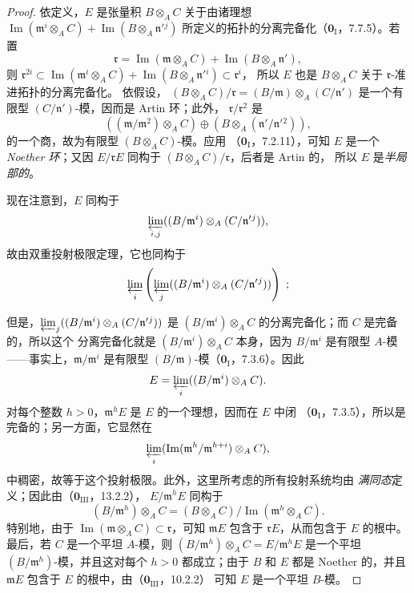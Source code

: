 \begin{proof}
依定义，$E$ 是张量积 $B\otimes_A C$ 关于由诸理想
$\operatorname{Im}(\mathfrak m^i\otimes_A C)+
\operatorname{Im}(B\otimes_A\mathfrak n'{}^j)$
所定义的拓扑的分离完备化（$\mathbf 0_{\mathrm I}$，7.7.5）。若置
\[
  \mathfrak r=\operatorname{Im}(\mathfrak m\otimes_A C)+
  \operatorname{Im}(B\otimes_A\mathfrak n'),
\]
则
$\mathfrak r^{2i}\subset
\operatorname{Im}(\mathfrak m^i\otimes_A C)+
\operatorname{Im}(B\otimes_A\mathfrak n'{}^i)\subset\mathfrak r^i$，
所以 $E$ 也是 $B\otimes_A C$ 关于 $\mathfrak r$-准进拓扑的分离完备化。
依假设，
$(B\otimes_A C)/\mathfrak r=(B/\mathfrak m)\otimes_A(C/\mathfrak n')$
是一个有限型 $(C/\mathfrak n')$-模，因而是 Artin 环；此外，
$\mathfrak r/\mathfrak r^2$ 是
\[
  ((\mathfrak m/\mathfrak m^2)\otimes_A C)
  \oplus(B\otimes_A(\mathfrak n'/\mathfrak n'{}^2)),
\]
的一个商，故为有限型 $(B\otimes_A C)$-模。应用
（$\mathbf 0_{\mathrm I}$，7.2.11），可知 $E$ 是一个\emph{Noether 环}；又因
$E/\mathfrak rE$ 同构于 $(B\otimes_A C)/\mathfrak r$，后者是 Artin 的，
所以 $E$ 是\emph{半局部的}。

现在注意到，$E$ 同构于
\[
  \varprojlim_{i,j}((B/\mathfrak m^i)\otimes_A(C/\mathfrak n'{}^j)),
\]
故由双重投射极限定理，它也同构于
\[
  \varprojlim_i\left(\varprojlim_j
  ((B/\mathfrak m^i)\otimes_A(C/\mathfrak n'{}^j))\right)~;
\]


但是，$\varprojlim_j((B/\mathfrak m^i)\otimes_A(C/\mathfrak n'{}^j))$
是 $(B/\mathfrak m^i)\otimes_A C$ 的分离完备化；而 $C$ 是完备的，所以这个
分离完备化就是 $(B/\mathfrak m^i)\otimes_A C$ 本身，因为
$B/\mathfrak m^i$ 是有限型 $A$-模——事实上，$\mathfrak m/\mathfrak m^i$
是有限型 $(B/\mathfrak m)$-模（$\mathbf 0_{\mathrm I}$，7.3.6）。因此
\[
  E=\varprojlim_i((B/\mathfrak m^i)\otimes_A C).
\]
对每个整数 $h>0$，$\mathfrak m^hE$ 是 $E$ 的一个理想，因而在 $E$ 中闭
（$\mathbf 0_{\mathrm I}$，7.3.5），所以是完备的；另一方面，它显然在
\[
  \varprojlim_i
  (\operatorname{Im}(\mathfrak m^h/\mathfrak m^{h+i})\otimes_A C),
\]
中稠密，故等于这个投射极限。此外，这里所考虑的所有投射系统均由
\emph{满同态}定义；因此由（$\mathbf 0_{\mathrm{III}}$，13.2.2），
$E/\mathfrak m^hE$ 同构于
\[
  (B/\mathfrak m^h)\otimes_A C
  =(B\otimes_A C)/\operatorname{Im}(\mathfrak m^h\otimes_A C).
\]
特别地，由于
$\operatorname{Im}(\mathfrak m\otimes_A C)\subset\mathfrak r$，可知
$\mathfrak mE$ 包含于 $\mathfrak rE$，从而包含于 $E$ 的根中。最后，若 $C$
是一个平坦 $A$-模，则
$(B/\mathfrak m^h)\otimes_A C=E/\mathfrak m^hE$
是一个平坦 $(B/\mathfrak m^h)$-模，并且这对每个 $h>0$ 都成立；由于 $B$ 和
$E$ 都是 Noether 的，并且
$\mathfrak mE$ 包含于 $E$ 的根中，由（$\mathbf 0_{\mathrm{III}}$，10.2.2）
可知 $E$ 是一个平坦 $B$-模。
\end{proof}

